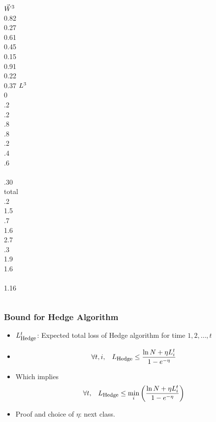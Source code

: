 \documentclass{beamer}
\begin{document}
\begin{frame}
\begin{columns}
\column[t]{1cm}
  $\vec{W}^3$ \\0.82\\ 0.27\\0.61\\0.45\\0.15\\ 0.91\\0.22 \\ 0.37 
\column[t]{1cm}
$L^3$ \\ 0 \\ .2 \\ .2  \\ .8 \\ .8 \\  .2 \\  .4  \\ .6 \\ ~ \\
\color<11>{red} .30 \\

\column[t]{2cm}
 total\\ .2 \\ 1.5 \\ .7  \\ 1.6 \\ 2.7 \\ .3 \\ 1.9  \\ 1.6 \\ ~ \\
 1.16 \\

\end{columns} 
\end{frame} 

\begin{frame}
\frametitle{Bound for Hedge Algorithm}
\begin{itemize}
\item
$L_{\mbox{\footnotesize Hedge}}^t$: Expected total loss of Hedge algorithm for time $1,2,\ldots,t$ 
\item
\[
\forall t,i, \;\;\;
L_{\mbox{\footnotesize Hedge}} \leq \frac{\ln N + \eta L_i^t}{1-e^{-\eta}}
\]
\item Which implies
\[
\forall t, \;\;\;
L_{\mbox{\footnotesize Hedge}} \leq \min_i \left( \frac{\ln N + \eta L_i^t}{1-e^{-\eta}} \right)
\]
\item
Proof and choice of $\eta$: next class.
\end{itemize}
\end{frame}
\end{document}
